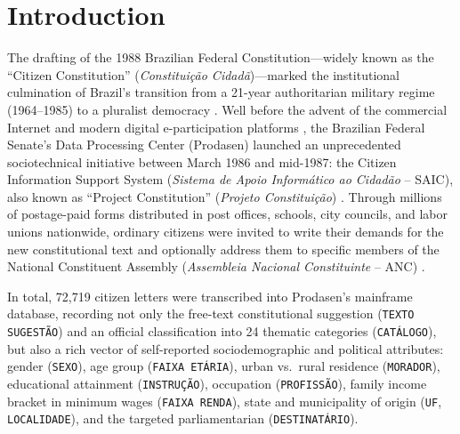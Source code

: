 \documentclass[pdflatex,sn-basic]{sn-jnl}
\begin{document}

\maketitle

\section{Introduction}\label{sec1}
The drafting of the 1988 Brazilian Federal Constitution---widely known as the ``Citizen Constitution'' (\textit{Constitui\c{c}\~{a}o Cidad\~{a}})---marked the institutional culmination of Brazil's transition from a 21-year authoritarian military regime (1964--1985) to a pluralist democracy \citep{souza2008regras,mcdonald2022making}. Well before the advent of the commercial Internet and modern digital e-participation platforms \citep{stieglitz2013social,pogrebinschi2014impact}, the Brazilian Federal Senate's Data Processing Center (Prodasen) launched an unprecedented sociotechnical initiative between March 1986 and mid-1987: the Citizen Information Support System (\textit{Sistema de Apoio Inform\'{a}tico ao Cidad\~{a}o} -- SAIC), also known as ``Project Constitution'' (\textit{Projeto Constitui\c{c}\~{a}o}) \citep{mcdonald2022making,santos2024lazer}. Through millions of postage-paid forms distributed in post offices, schools, city councils, and labor unions nationwide, ordinary citizens were invited to write their demands for the new constitutional text and optionally address them to specific members of the National Constituent Assembly (\textit{Assembleia Nacional Constituinte} -- ANC) \citep{montambeault2018constituicao,mcdonald2022making}.

In total, 72,719 citizen letters were transcribed into Prodasen's mainframe database, recording not only the free-text constitutional suggestion (\texttt{TEXTO SUGEST\~{A}O}) and an official classification into 24 thematic categories (\texttt{CAT\'{A}LOGO}), but also a rich vector of self-reported sociodemographic and political attributes: gender (\texttt{SEXO}), age group (\texttt{FAIXA ET\'{A}RIA}), urban vs.\ rural residence (\texttt{MORADOR}), educational attainment (\texttt{INSTRU\c{C}\~{A}O}), occupation (\texttt{PROFISS\~{A}O}), family income bracket in minimum wages (\texttt{FAIXA RENDA}), state and municipality of origin (\texttt{UF}, \texttt{LOCALIDADE}), and the targeted parliamentarian (\texttt{DESTINAT\'{A}RIO}).
\end{document}
